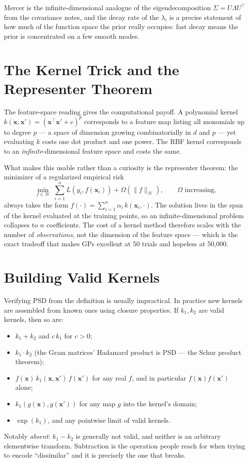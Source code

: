 \documentclass[conference]{IEEEtran}
\begin{document}
\medskip
Mercer is the infinite-dimensional analogue of the eigendecomposition $\Sigma = U\Lambda U^{\!\top}$ from the covariance notes, and the decay rate of the $\lambda_i$ is a precise statement of how much of the function space the prior really occupies: fast decay means the prior is concentrated on a few smooth modes.

\section*{The Kernel Trick and the Representer Theorem}
The feature-space reading gives the computational payoff. A polynomial kernel $k(\mathbf{x},\mathbf{x}') = (\mathbf{x}^{\!\top}\mathbf{x}' + c)^p$ corresponds to a feature map listing all monomials up to degree $p$ --- a space of dimension growing combinatorially in $d$ and $p$ --- yet evaluating $k$ costs one dot product and one power. The RBF kernel corresponds to an \textit{infinite}-dimensional feature space and costs the same.

What makes this usable rather than a curiosity is the representer theorem: the minimizer of a regularized empirical risk
\begin{equation}
    \min_{f \in \mathcal{H}} \; \sum_{i=1}^{n} L\!\left(y_i, f(\mathbf{x}_i)\right) + \Omega\!\left(\|f\|_{\mathcal{H}}\right),
    \qquad \Omega \text{ increasing},
\end{equation}
always takes the form $f(\cdot) = \sum_{i=1}^{n}\alpha_i\, k(\mathbf{x}_i,\cdot)$. The solution lives in the span of the kernel evaluated at the training points, so an infinite-dimensional problem collapses to $n$ coefficients. The cost of a kernel method therefore scales with the number of \textit{observations}, not the dimension of the feature space --- which is the exact tradeoff that makes GPs excellent at 50 trials and hopeless at 50{,}000.

\section*{Building Valid Kernels}
Verifying PSD from the definition is usually impractical. In practice new kernels are assembled from known ones using closure properties. If $k_1,k_2$ are valid kernels, then so are:
\begin{itemize}
    \item $k_1 + k_2$ and $c\,k_1$ for $c > 0$;
    \item $k_1 \cdot k_2$ (the Gram matrices' Hadamard product is PSD --- the Schur product theorem);
    \item $f(\mathbf{x})\,k_1(\mathbf{x},\mathbf{x}')\,f(\mathbf{x}')$ for any real $f$, and in particular $f(\mathbf{x})f(\mathbf{x}')$ alone;
    \item $k_1(g(\mathbf{x}), g(\mathbf{x}'))$ for any map $g$ into the kernel's domain;
    \item $\exp(k_1)$, and any pointwise limit of valid kernels.
\end{itemize}
Notably \textit{absent}: $k_1 - k_2$ is generally not valid, and neither is an arbitrary elementwise transform. Subtraction is the operation people reach for when trying to encode ``dissimilar'' and it is precisely the one that breaks.
\end{document}
